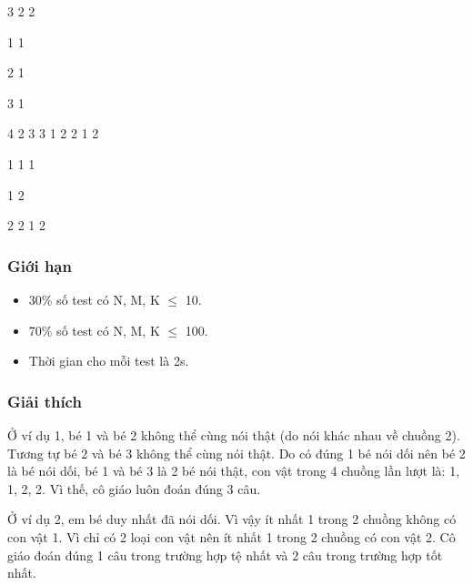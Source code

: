            3 2 2          

           1 1          

           2 1          

           3 1          

           4 2                    3 3                   1 2 2 1 2         

           1 1 1          

           1 2          

           2 2                    1 2         




\subsubsection{     Giới hạn    }
\begin{itemize}
	\item        30\% số test có    N, M, K  $\le$  10.      
	\item        70\% số test có    N, M, K  $\le$  100.      
	\item        Thời gian cho    mỗi test là 2s.      
\end{itemize}

\subsubsection{     Giải thích    }

      Ở ví dụ 1, bé 1 và bé  2 không thể cùng nói thật (do nói khác nhau về chuồng 2).  Tương tự bé 2 và bé 3 không thể cùng nói thật. Do có  đúng 1 bé nói dối nên bé 2 là bé nói dối, bé 1 và bé  3 là 2 bé nói thật, con vật trong 4 chuồng lần lượt là:  1, 1, 2, 2. Vì thế, cô giáo luôn đoán đúng 3 câu.     

      Ở ví dụ 2, em bé duy  nhất đã nói dối. Vì vậy ít nhất 1 trong 2 chuồng không  có con vật 1. Vì chỉ có 2 loại con vật nên ít nhất 1  trong 2 chuồng có con vật 2. Cô giáo đoán đúng 1 câu trong  trường hợp tệ nhất và 2 câu trong trường hợp tốt nhất.     
